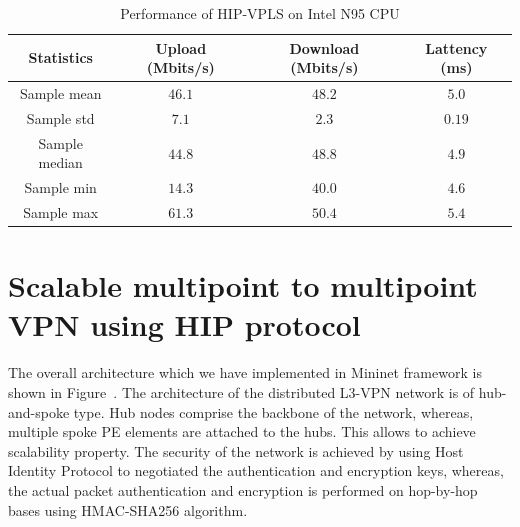 \begin{table}
    \centering
    \begin{tabular}{|c|c|c|c|}
    \hline
    Statistics     & Upload (Mbits/s)        & Download (Mbits/s)     & Lattency (ms) \\\hline
    Sample mean    & $46.1$                  & $48.2$                 & $5.0$         \\
    Sample std     & $7.1$                   & $2.3$                  & $0.19$        \\
    Sample median  & $44.8$                  & $48.8$                 & $4.9$         \\
    Sample min     & $14.3$                  & $40.0$                 & $4.6$         \\
    Sample max     & $61.3$                  & $50.4$                 & $5.4$         \\
    \hline
    \end{tabular}
    \caption{Performance of HIP-VPLS on Intel N95 CPU}  
    \label{tab:vpls-performance}
\end{table}




\section{Scalable multipoint to multipoint VPN using HIP protocol}

The overall architecture which we have implemented in
Mininet framework is shown in Figure~\cite{fig:l3vpn}. The architecture
of the distributed L3-VPN network is of hub-and-spoke type.
Hub nodes comprise the backbone of the network, whereas,
multiple spoke PE elements are attached to the hubs. This
allows to achieve scalability property. The security of the 
network is achieved by using Host Identity Protocol to negotiated
the authentication and encryption keys, whereas, the actual packet authentication
and encryption is performed on hop-by-hop bases using HMAC-SHA256
algorithm. 

